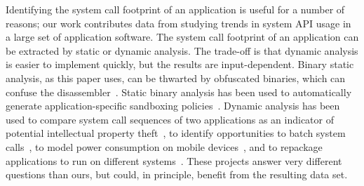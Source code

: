 
Identifying the system call footprint of an application is useful for a number of reasons;
our work contributes data from studying trends in system API usage in a large set of application software.
The system call footprint of an application can be extracted by static or dynamic analysis.
The trade-off is that dynamic analysis is easier to implement quickly, but the results are input-dependent.
Binary static analysis, as this paper uses, 
can be thwarted by obfuscated binaries,
which can confuse the disassembler~\cite{zhang13cfi}.
Static binary analysis has been used to automatically generate application-specific sandboxing 
policies~\cite{policy-extraction}.
Dynamic analysis has been used to compare system call sequences of two applications
as an indicator of potential intellectual property theft~\cite{software-theft},
to identify opportunities to batch system calls~\cite{multi-call},
to model power consumption on mobile devices~\cite{power-modelling},
and to repackage applications to run on different systems~\cite{cde}.
These projects answer very different questions than ours, but could, in principle, benefit
from the resulting data set.

